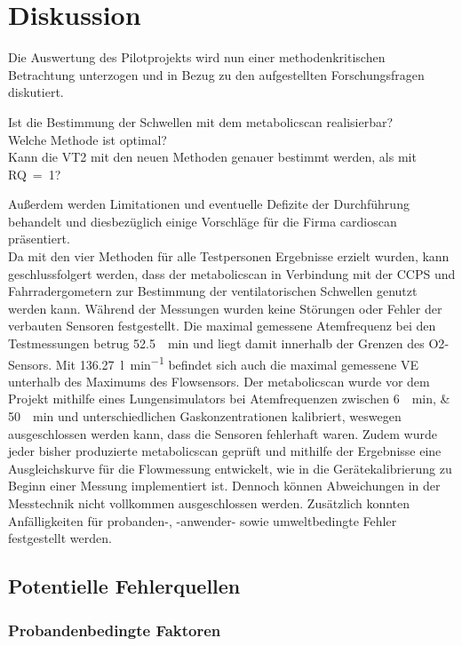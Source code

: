 \chapter{Diskussion}

Die Auswertung des Pilotprojekts wird nun einer methodenkritischen Betrachtung unterzogen und in Bezug zu den aufgestellten Forschungsfragen diskutiert. 
%
\begin{tabbing}
	Ist die Bestimmung der Schwellen mit dem metabolicscan realisierbar?\\
	Welche Methode ist optimal?\\
	Kann die VT2 mit den neuen Methoden genauer bestimmt werden, als mit RQ~=~1?
\end{tabbing}
%
Außerdem werden Limitationen und eventuelle Defizite der Durchführung behandelt und diesbezüglich einige Vorschläge für die Firma cardioscan präsentiert.\\[1em]
Da mit den vier Methoden für alle Testpersonen Ergebnisse erzielt wurden, kann geschlussfolgert werden, dass der metabolicscan in Verbindung mit der \acs{CCPS} und Fahrradergometern zur Bestimmung der ventilatorischen Schwellen genutzt werden kann. Während der Messungen wurden keine Störungen oder Fehler der verbauten Sensoren festgestellt. Die maximal gemessene Atemfrequenz bei den Testmessungen betrug \SI{52,5}{\per\minute} und liegt damit innerhalb der Grenzen des \acs{O2}-Sensors. Mit \SI{136,27}{\litre\per\minute} befindet sich auch die maximal gemessene \acs{VE} unterhalb des Maximums des Flowsensors. Der metabolicscan wurde vor dem Projekt mithilfe eines Lungensimulators bei Atemfrequenzen zwischen \SIlist{6;50}{\per\minute} und unterschiedlichen Gaskonzentrationen kalibriert, weswegen ausgeschlossen werden kann, dass die Sensoren fehlerhaft waren. Zudem wurde jeder bisher produzierte metabolicscan geprüft und mithilfe der Ergebnisse eine Ausgleichskurve für die Flowmessung entwickelt, wie in die Gerätekalibrierung zu Beginn einer Messung implementiert ist. Dennoch können Abweichungen in der Messtechnik nicht vollkommen ausgeschlossen werden. Zusätzlich konnten Anfälligkeiten für probanden-, -anwender- sowie umweltbedingte Fehler festgestellt werden.

\section{Potentielle Fehlerquellen}

\subsection{Probandenbedingte Faktoren}

